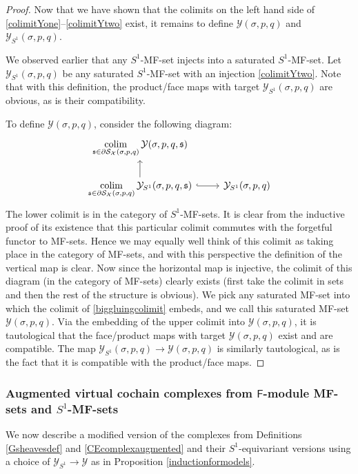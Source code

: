 \documentclass[12pt]{article}
\theoremstyle{definition}
\theoremstyle{remark}
\numberwithin{equation}{subsection}
\newcommand{\s}{\mathfrak s}
\newcommand{\X}{\mathcal X}
\newcommand{\Y}{\mathcal Y}
\newcommand{\SSS}{\mathcal S}
\newcommand{\colim}{\operatornamewithlimits{colim}}
\newcommand{\sF}{\mathsf{F}}
\begin{document}
\begin{proof}
Now that we have shown that the colimits on the left hand side of \eqref{colimitYone}--\eqref{colimitYtwo} exist, it remains to define $\Y(\sigma,p,q)$ and $\Y_{S^1}(\sigma,p,q)$.

We observed earlier that any $S^1$-MF-set injects into a saturated $S^1$-MF-set.  Let $\Y_{S^1}(\sigma,p,q)$ be any saturated $S^1$-MF-set with an injection \eqref{colimitYtwo}.  Note that with this definition, the product/face maps with target $\Y_{S^1}(\sigma,p,q)$ are obvious, as is their compatibility.

To define $\Y(\sigma,p,q)$, consider the following diagram:
\begin{equation}\label{biggluingcolimit}
\begin{tikzcd}
\displaystyle\colim_{\s\in\partial\SSS_\X(\sigma,p,q)}\Y(\sigma,p,q,\s)\\
\displaystyle\colim_{\s\in\partial\SSS_\X(\sigma,p,q)}\Y_{S^1}(\sigma,p,q,\s)\ar{u}\ar[hook]{r}&\Y_{S^1}(\sigma,p,q)
\end{tikzcd}
\end{equation}
The lower colimit is in the category of $S^1$-MF-sets.  It is clear from the inductive proof of its existence that this particular colimit commutes with the forgetful functor to MF-sets.  Hence we may equally well think of this colimit as taking place in the category of MF-sets, and with this perspective the definition of the vertical map is clear.  Now since the horizontal map is injective, the colimit of this diagram (in the category of MF-sets) clearly exists (first take the colimit in sets and then the rest of the structure is obvious).  We pick any saturated MF-set into which the colimit of \eqref{biggluingcolimit} embeds, and we call this saturated MF-set $\Y(\sigma,p,q)$.  Via the embedding of the upper colimit into $\Y(\sigma,p,q)$, it is tautological that the face/product maps with target $\Y(\sigma,p,q)$ exist and are compatible.  The map $\Y_{S^1}(\sigma,p,q)\to\Y(\sigma,p,q)$ is similarly tautological, as is the fact that it is compatible with the product/face maps.
\end{proof}

\subsubsection{Augmented virtual cochain complexes from $\sF$-module MF-sets and $S^1$-MF-sets}\label{SSaugmentedsec}

We now describe a modified version of the complexes from Definitions \ref{Gsheavesdef} and \ref{CEcomplexaugmented} and their $S^1$-equivariant versions using a choice of $\Y_{S^1}\to\Y$ as in Proposition \ref{inductionformodels}.
\end{document}
